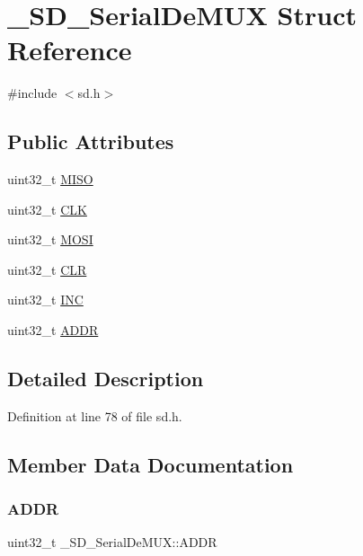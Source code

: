 \hypertarget{struct__SD__SerialDeMUX}{}\section{\+\_\+\+S\+D\+\_\+\+Serial\+De\+M\+UX Struct Reference}
\label{struct__SD__SerialDeMUX}


{\ttfamily \#include $<$sd.\+h$>$}

\subsection*{Public Attributes}
\begin{DoxyCompactItemize}
\item 
uint32\+\_\+t \mbox{\hyperlink{struct__SD__SerialDeMUX_abc0f0be4703e8ddc6535ede03bf59558}{M\+I\+SO}}
\item 
uint32\+\_\+t \mbox{\hyperlink{struct__SD__SerialDeMUX_a386c8796167b73fc8f0be3c493072731}{C\+LK}}
\item 
uint32\+\_\+t \mbox{\hyperlink{struct__SD__SerialDeMUX_a6c0fa597d2f0baf4c256fab7a9bc2b4e}{M\+O\+SI}}
\item 
uint32\+\_\+t \mbox{\hyperlink{struct__SD__SerialDeMUX_a1b2d8033e7fad3fc3fdee6be4c3fcc8a}{C\+LR}}
\item 
uint32\+\_\+t \mbox{\hyperlink{struct__SD__SerialDeMUX_a131cdf29c39f177ce98cdbc3e1dc3fa4}{I\+NC}}
\item 
uint32\+\_\+t \mbox{\hyperlink{struct__SD__SerialDeMUX_a2b7e875d56e54ff5b2525e794e3dc560}{A\+D\+DR}}
\end{DoxyCompactItemize}


\subsection{Detailed Description}


Definition at line 78 of file sd.\+h.



\subsection{Member Data Documentation}
\mbox{\label{struct__SD__SerialDeMUX_a2b7e875d56e54ff5b2525e794e3dc560}} 
\subsubsection{\texorpdfstring{ADDR}{ADDR}}
{\footnotesize\ttfamily uint32\+\_\+t \+\_\+\+S\+D\+\_\+\+Serial\+De\+M\+U\+X\+::\+A\+D\+DR}



